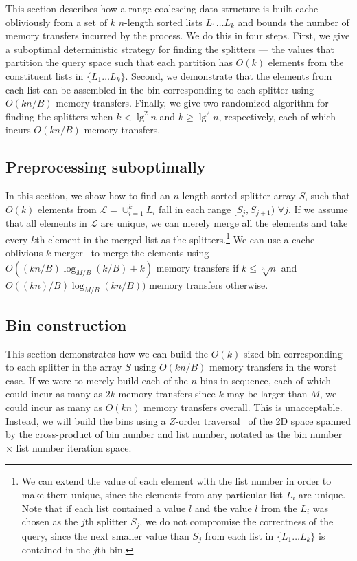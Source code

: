 
This section describes how a range coalescing data structure is built cache-obliviously
from a set of $k$ $n$-length sorted lists $L_1 \ldots L_k$ and bounds
the number of memory transfers incurred by the process.  We do this in four steps.
First, we give a suboptimal deterministic strategy for finding the splitters 
--- the values that partition the query space such that each partition has $O(k)$ 
elements from the constituent lists in $\{ L_1 \ldots L_k \}$.  Second, we 
demonstrate that the elements from each list can be assembled in the bin corresponding
to each splitter using $O(kn / B)$ memory transfers.  
Finally, we give two randomized algorithm for finding the splitters when 
$k < \lg^2 n$ and $k \geq \lg^2 n$, 
respectively, each of which incurs $O(kn/B)$ memory transfers.  

\subsection*{Preprocessing suboptimally}

In this section, we show how to find an $n$-length sorted splitter array $S$, such that $O(k)$
elements from $\mathcal{L} = \cup_{i=1}^{k}L_i$ fall in each range 
$[S_j,S_{j+1})$ $\forall j$.  If we assume that all elements in $\mathcal{L}$ are 
unique, we can merely merge all the elements and take every $k$th element in the
merged list as the splitters.\footnote{We can extend the value of each element with the
list number in order to make them unique, since the elements from any particular
list $L_i$ are unique.  Note that if each list contained a value $l$ and the
value $l$ from
the $L_i$ was chosen as the $j$th splitter $S_j$, we do not compromise the correctness of the 
query, since the next smaller value than $S_j$ from each list in $\{ L_1 \ldots L_k\}$ is 
contained in the $j$th bin.} We can use a cache-oblivious 
$k$-merger~\cite{FrigoLePr99} to merge the elements using 
$O((kn/B) \log_{M/B} (k/B) + k)$ memory transfers if $k \leq \sqrt[3]{n}$ and
$O((kn)/B) \log_{M/B} (kn/B))$ memory transfers otherwise.



\subsection*{Bin construction}

This section demonstrates how we can build the $O(k)$-sized bin corresponding to each splitter
in the array $S$ using $O(kn/B)$ memory transfers in the worst case.
If we were to merely build each of the $n$ bins in sequence, each of which could
incur as many as $2k$ memory transfers since $k$ may be larger than $M$, we could
incur as many as $O(kn)$ memory transfers overall.  This is unacceptable.  
Instead, we will build the bins using a $Z$-order traversal~\cite{Morton66} of 
the 2D space spanned by the cross-product of bin number and list number, notated
as the bin number $\times$ list number iteration space.

